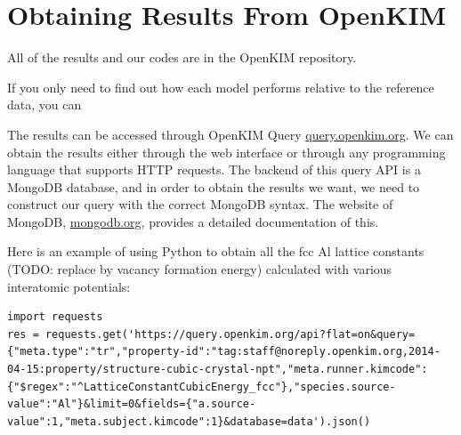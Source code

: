 \documentclass[%
 reprint,
 amsmath,amssymb,
 aps,
]{revtex4-1}
\begin{document}
%


\section{Obtaining Results From OpenKIM}
\label{app:data}
All of the results and our codes are in the OpenKIM repository.

If you only need to find out how each model performs relative to the reference data, you can

The results can be accessed through OpenKIM Query \url{query.openkim.org}.
We can obtain the results either through the web interface or through any programming language that supports HTTP requests.
The backend of this query API is a MongoDB database, and in order to obtain the results we want, we need to construct our query with the correct MongoDB syntax.
The website of MongoDB, \url{mongodb.org}, provides a detailed documentation of this.

Here is an example of using Python to obtain all the fcc Al lattice constants (TODO: replace by vacancy formation energy) calculated with various interatomic potentials:
\begin{lstlisting}
import requests
res = requests.get('https://query.openkim.org/api?flat=on&query={"meta.type":"tr","property-id":"tag:staff@noreply.openkim.org,2014-04-15:property/structure-cubic-crystal-npt","meta.runner.kimcode":{"$regex":"^LatticeConstantCubicEnergy_fcc"},"species.source-value":"Al"}&limit=0&fields={"a.source-value":1,"meta.subject.kimcode":1}&database=data').json()
\end{lstlisting}
\end{document}
